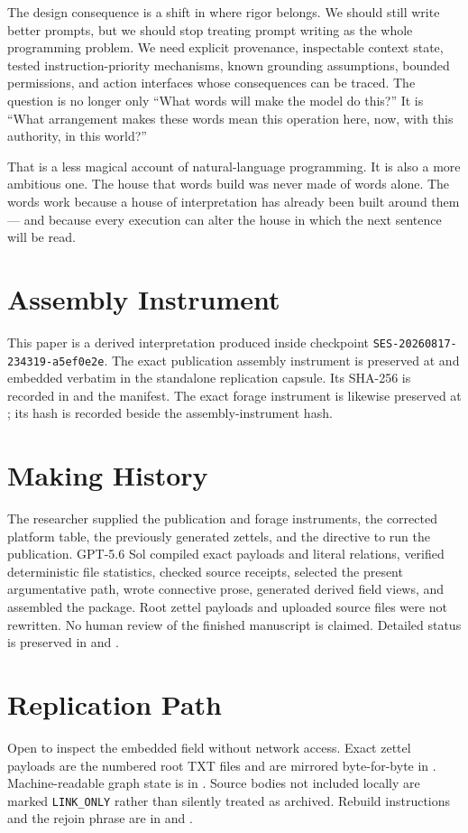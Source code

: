 \documentclass[11pt]{article}
\begin{document}
The design consequence is a shift in where rigor belongs. We should still write better prompts, but we should stop treating prompt writing as the whole programming problem. We need explicit provenance, inspectable context state, tested instruction-priority mechanisms, known grounding assumptions, bounded permissions, and action interfaces whose consequences can be traced. The question is no longer only ``What words will make the model do this?'' It is ``What arrangement makes these words mean this operation here, now, with this authority, in this world?''

That is a less magical account of natural-language programming. It is also a more ambitious one. The house that words build was never made of words alone. The words work because a house of interpretation has already been built around them --- and because every execution can alter the house in which the next sentence will be read.

{\raggedright\printbibliography}

\appendix
\section{Assembly Instrument}
This paper is a derived interpretation produced inside checkpoint \texttt{SES-20260817-234319-a5ef0e2e}. The exact publication assembly instrument is preserved at  and embedded verbatim in the standalone  replication capsule. Its SHA-256 is recorded in  and the manifest. The exact forage instrument is likewise preserved at ; its hash is recorded beside the assembly-instrument hash.

\section{Making History}
The researcher supplied the publication and forage instruments, the corrected platform table, the previously generated zettels, and the directive to run the publication. GPT-5.6 Sol compiled exact payloads and literal relations, verified deterministic file statistics, checked source receipts, selected the present argumentative path, wrote connective prose, generated derived field views, and assembled the package. Root zettel payloads and uploaded source files were not rewritten. No human review of the finished manuscript is claimed. Detailed status is preserved in  and .

\section{Replication Path}
Open  to inspect the embedded field without network access. Exact zettel payloads are the numbered root TXT files and are mirrored byte-for-byte in . Machine-readable graph state is in . Source bodies not included locally are marked \texttt{LINK\_ONLY} rather than silently treated as archived. Rebuild instructions and the rejoin phrase are in  and .
\end{document}

